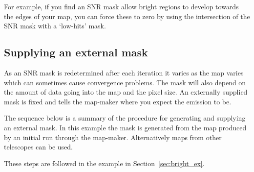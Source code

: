 \documentclass[twoside,11pt]{article}
\newcommand{\htmlref}[2]{#1}
\newcommand{\latexhtml}[2]{#1}
\newcommand{\xlabel}[1]{}
\renewcommand{\_}{\texttt{\symbol{95}}}
\newcommand{\cref}[3]{\latexhtml{#1~\ref{#2}}{\htmlref{#3}{#2}}}
\begin{document}
For example, if you find an SNR mask allow bright regions to develop
towards the edges of your map, you can force these to zero by using
the intersection of the SNR mask with a `low-hits' mask.

\subsection{\xlabel{maskbe}Supplying an external mask}
\label{sec:maskbe}

As an SNR mask is redetermined after each iteration it varies as the
map varies which can sometimes cause convergence problems. The mask
will also depend on the amount of data going into the map and the
pixel size. An externally supplied mask is fixed and tells the
map-maker where you expect the emission to be. 

The sequence below is a summary of the procedure for generating and
supplying an external mask. In this example the mask is generated from
the map produced by an initial run through the map-maker.
Alternatively maps from other telescopes can be used.

These steps are followed in the example in \cref{Section}{sec:bright_ex}{Extended galactic sources}.
\end{document}
